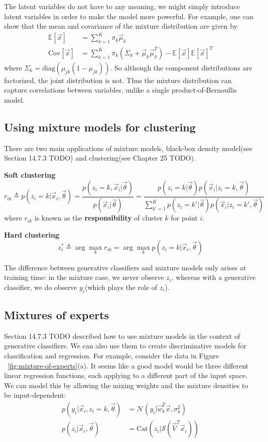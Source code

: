 The latent variables do not have to any meaning, we might simply introduce latent variables in order to make the model more powerful. For example, one can show that the mean and covariance of the mixture distribution are given by
\begin{align}
\mathbb{E}[\vec{x}] & = \sum\limits_{k=1}^K \pi_k\vec{\mu}_k \\
\mathrm{Cov}[\vec{x}] & = \sum\limits_{k=1}^K \pi_k(\Sigma_k+\vec{\mu}_k\vec{\mu}_k^T)-\mathbb{E}[\vec{x}]\mathbb{E}[\vec{x}]^T
\end{align}
where $\Sigma_k=\mathrm{diag}(\mu_{jk}(1-\mu_{jk}))$. So although the component distributions are factorized, the joint distribution is not. Thus the mixture distribution can capture correlations between variables, unlike a single product-of-Bernoullis model.




\subsection{Using mixture models for clustering}
There are two main applications of mixture models, black-box density model(see Section 14.7.3 TODO) and clustering(see Chapter 25 TODO).

\textbf{Soft clustering}
\begin{equation}
r_{ik} \triangleq p(z_i=k|\vec{x}_i,\vec{\theta})=\dfrac{p(z_i=k,\vec{x}_i|\vec{\theta})}{p(\vec{x}_i|\vec{\theta})}=\dfrac{p(z_i=k|\vec{\theta})p(\vec{x}_i|z_i=k,\vec{\theta})}{\sum_{k'=1}^K p(z_i=k'|\vec{\theta})p(\vec{x}_i|z_i=k',\vec{\theta})}
\end{equation}
where $r_{ik}$ is known as the \textbf{responsibility} of cluster $k$ for point $i$.

\textbf{Hard clustering}
\begin{equation}
z_i^* \triangleq \arg\max_k r_{ik}=\arg\max_k p(z_i=k|\vec{x}_i,\vec{\theta})
\end{equation}

The difference between generative classifiers and mixture models only arises at training time: in the mixture case, we never observe $z_i$, whereas with a generative classifier, we do observe $y_i$(which plays the role of $z_i$).


\subsection{Mixtures of experts}
Section 14.7.3 TODO described how to use mixture models in the context of generative classifiers. We can also use them to create discriminative models for classification and regression. For example, consider the data in Figure ~\ref{fig:mixture-of-experts}(a). It seems like a good model would be three different linear regression functions, each applying to a different part of the input space. We can model this by allowing the mixing weights and the mixture densities to be input-dependent:
\begin{align}
p(y_i|\vec{x}_i,z_i=k,\vec{\theta}) & =\mathcal{N}(y_i|\vec{w}_k^T\vec{x},\sigma_k^2) \\
p(z_i | \vec{x}_i,\vec{\theta}) & = \mathrm{Cat}(z_i|\mathcal{S}(\vec{V}^T\vec{x}_i))
\end{align}

